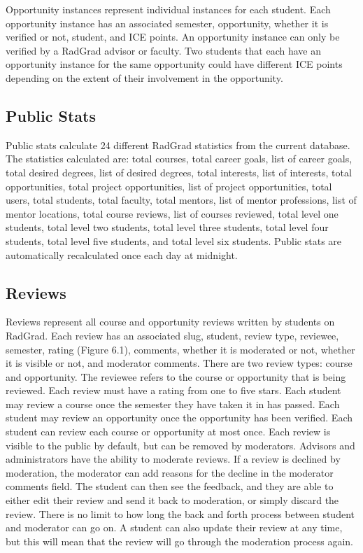 Opportunity instances represent individual instances for each student. Each opportunity instance has an associated semester, opportunity, whether it is verified or not, student, and ICE points. An opportunity instance can only be verified by a RadGrad advisor or faculty. Two students that each have an opportunity instance for the same opportunity could have different ICE points depending on the extent of their involvement in the opportunity.    

\subsection{Public Stats}
Public stats calculate 24 different RadGrad statistics from the current database. The statistics calculated are: total courses, total career goals, list of career goals, total desired degrees, list of desired degrees, total interests, list of interests, total opportunities, total project opportunities, list of project opportunities, total users, total students, total faculty, total mentors, list of mentor professions, list of mentor locations, total course reviews, list of courses reviewed, total level one students, total level two students, total level three students, total level four students, total level five students, and total level six students. Public stats are automatically recalculated once each day at midnight. 

\subsection{Reviews}
Reviews represent all course and opportunity reviews written by students on RadGrad. Each review has an associated slug, student, review type, reviewee, semester, rating (Figure 6.1), comments, whether it is moderated or not, whether it is visible or not, and moderator comments. There are two review types: course and opportunity. The reviewee refers to the course or opportunity that is being reviewed. Each review must have a rating from one to five stars. Each student may review a course once the semester they have taken it in has passed. Each student may review an opportunity once the opportunity has been verified. Each student can review each course or opportunity at most once. Each review is visible to the public by default, but can be removed by moderators. Advisors and administrators have the ability to moderate reviews. If a review is declined by moderation, the moderator can add reasons for the decline in the moderator comments field. The student can then see the feedback, and they are able to either edit their review and send it back to moderation, or simply discard the review. There is no limit to how long the back and forth process between student and moderator can go on. A student can also update their review at any time, but this will mean that the review will go through the moderation process again.


